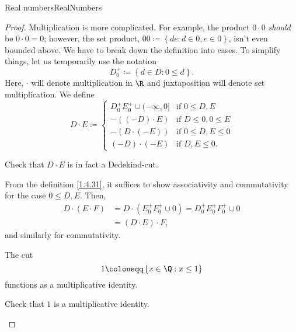 \begin{thm}{Real numbers}{RealNumbers}
\begin{proof}
Multiplication is more complicated.  For example, the product $0\cdot 0$ \emph{should} be $0\cdot 0=0$; however, the set product, $00\coloneqq \left\{ de:d\in 0,e\in 0\right\}$, isn't even bounded above.  We have to break down the definition into cases.  To simplify things, let us temporarily use the notation
\begin{equation}
D_0^+\coloneqq \left\{ d\in D:0\leq d\right\} .
\end{equation}
Here, $\cdot$ will denote multiplication in $\R$ and juxtaposition will denote set multiplication.  We define
\begin{equation}\label{1.4.31}
D\cdot E\coloneqq \begin{cases}D_0^+E_0^+\cup (-\infty ,0] & \text{if }0\leq D,E  \\ -\left( (-D)\cdot E\right) & \text{if }D\leq 0,0\leq E \\ -\left( D\cdot (-E)\right) & \text{if }0\leq D,E\leq 0 \\ (-D)\cdot (-E) & \text{if }D,E\leq 0.\end{cases}
\end{equation}
\begin{exr}[breakable=false]{}{}
Check that $D\cdot E$ is in fact a Dedekind-cut.
\end{exr}

From the definition \eqref{1.4.31}, it suffices to show associativity and commutativity for the case $0\leq D,E$.  Then,
\begin{equation}
\begin{split}
D\cdot (E\cdot F) & =D\cdot \left( E_0^+F_0^+\cup 0\right) =D_0^+E_0^+F_0^+\cup 0 \\
& =(D\cdot E)\cdot F,
\end{split}
\end{equation}
and similarly for commutativity.  

The cut
\begin{equation}
1\coloneqq \left\{ x\in \Q :x\leq 1\right\}
\end{equation}
functions as a multiplicative identity.
\begin{exr}[breakable=false]{}{}
Check that $1$ is a multiplicative identity.
\end{exr}


\end{proof}
\end{thm}
